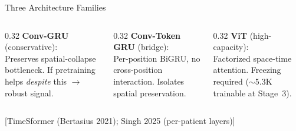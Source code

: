 \documentclass[aspectratio=169, 11pt]{beamer}
\newcommand{\emphcite}[1]{\textcolor{DukeBlue!70}{\footnotesize [#1]}}
\begin{document}
\begin{frame}{Three Architecture Families}
\begin{center}
\end{center}

\vspace{0.3em}

\begin{columns}[T]
\begin{column}{0.32\textwidth}
\small
\textbf{Conv-GRU} (conservative):\\
Preserves spatial-collapse bottleneck. If pretraining helps \emph{despite} this $\to$ robust signal.
\end{column}
\begin{column}{0.32\textwidth}
\small
\textbf{Conv-Token GRU} (bridge):\\
Per-position BiGRU, no cross-position interaction. Isolates spatial preservation.
\end{column}
\begin{column}{0.32\textwidth}
\small
\textbf{ViT} (high-capacity):\\
Factorized space-time attention. Freezing required ($\sim$5.3K trainable at Stage~3).
\end{column}
\end{columns}

\emphcite{TimeSformer (Bertasius 2021); Singh 2025 (per-patient layers)}
\end{frame}

\end{document}
